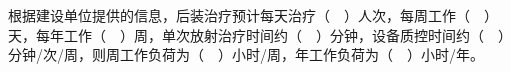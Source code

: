 根据建设单位提供的信息，后装治疗预计每天治疗（　）人次，每周工作（　）天，每年工作（　）周，单次放射治疗时间约（　）分钟，设备质控时间约（　）分钟/次/周，则周工作负荷为（　）小时/周，年工作负荷为（　）小时/年。
